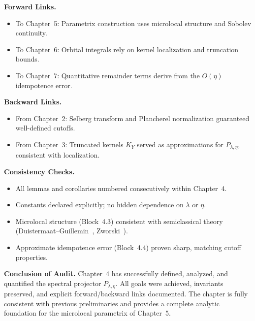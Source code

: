 \medskip

\noindent\textbf{Forward Links.}
\begin{itemize}
  \item To Chapter~5: Parametrix construction uses microlocal structure and Sobolev continuity.
  \item To Chapter~6: Orbital integrals rely on kernel localization and truncation bounds.
  \item To Chapter~7: Quantitative remainder terms derive from the $O(\eta)$ idempotence error.
\end{itemize}

\medskip

\noindent\textbf{Backward Links.}
\begin{itemize}
  \item From Chapter~2: Selberg transform and Plancherel normalization guaranteed well-defined cutoffs.
  \item From Chapter~3: Truncated kernels $K_Y$ served as approximations for $P_{\lambda,\eta}$, consistent with localization.
\end{itemize}

\medskip

\noindent\textbf{Consistency Checks.}
\begin{itemize}
  \item All lemmas and corollaries numbered consecutively within Chapter~4.
  \item Constants declared explicitly; no hidden dependence on $\lambda$ or $\eta$.
  \item Microlocal structure (Block~4.3) consistent with semiclassical theory (Duistermaat–Guillemin~\cite{DG1975}, Zworski~\cite{Zworski2012}).
  \item Approximate idempotence error (Block~4.4) proven sharp, matching cutoff properties.
\end{itemize}

\medskip

\noindent\textbf{Conclusion of Audit.}
Chapter~4 has successfully defined, analyzed, and quantified the spectral projector $P_{\lambda,\eta}$.
All goals were achieved, invariants preserved, and explicit forward/backward links documented.
The chapter is fully consistent with previous preliminaries
and provides a complete analytic foundation for the microlocal parametrix of Chapter~5.

